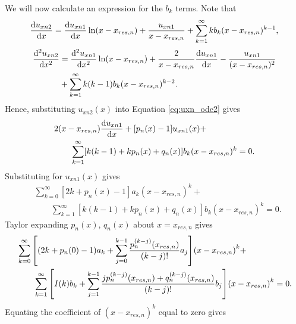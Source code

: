 We will now calculate an expression for the $b_k$ terms. Note that
\[\dv{u_{xn2}}{x} = \dv{u_{xn1}}{x}\ln(x-x_{res,n}) + \frac{u_{xn1}}{x-x_{res,n}} + \sum_{k=1}^\infty kb_k(x-x_{res,n})^{k-1},\]
\[\begin{aligned}
\dv[2]{u_{xn2}}{x} &= \dv[2]{u_{xn1}}{x}\ln(x-x_{res,n}) + \frac{2}{x-x_{res,n}}\dv{u_{xn1}}{x} - \frac{u_{xn1}}{(x-x_{res,n})^2} \\
&+ \sum_{k=1}^\infty k(k-1)b_k(x-x_{res,n})^{k-2}.
\end{aligned}\]
Hence, substituting $u_{xn2}(x)$ into Equation \eqref{eq:uxn_ode2} gives
\[\begin{aligned}
&2(x-x_{res,n})\dv{u_{xn1}}{x}+[p_n(x) - 1]u_{xn1}(x) + \\
&\qquad\sum_{k=1}^\infty[k(k - 1) + kp_n(x) + q_n(x)]b_k(x-x_{res,n})^k = 0.
\end{aligned}\]
Substituting for $u_{xn1}(x)$ gives
\[\begin{aligned}
&\sum_{k=0}^\infty[2k + p_n(x) - 1]a_k(x-x_{res,n})^k + \\
&\qquad\sum_{k=1}^\infty [k(k - 1) + kp_n(x) + q_n(x)]b_k(x-x_{res,n})^k = 0.
\end{aligned}\]
Taylor expanding $p_n(x)$, $q_n(x)$ about $x=x_{res,n}$ gives
\[\begin{aligned}
&\sum_{k=0}^\infty\qty[(2k + p_n(0) - 1)a_k + \sum_{j=0}^{k-1}\frac{p_n^{(k-j)}(x_{res,n})}{(k-j)!}a_j] \qty(x-x_{res,n})^k + \\
&\qquad\sum_{k=1}^\infty \qty[I(k)b_k + \sum_{j=1}^{k-1}\frac{jp_n^{(k-j)}(x_{res,n})+q_n^{(k-j)}(x_{res,n})}{(k-j)!}b_j] \qty(x-x_{res,n})^k = 0.
\end{aligned}\]
Equating the coefficient of $(x-x_{res,n})^k$ equal to zero gives
